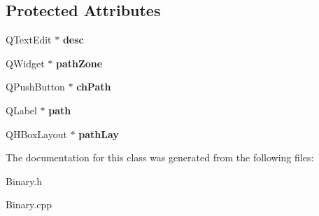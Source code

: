 \subsection*{\-Protected \-Attributes}
\begin{DoxyCompactItemize}
\item 
\hypertarget{classBinaryEditor_adb862f876130ef1677d7e62c9b72975e}{\-Q\-Text\-Edit $\ast$ {\bfseries desc}}\label{classBinaryEditor_adb862f876130ef1677d7e62c9b72975e}

\item 
\hypertarget{classBinaryEditor_a8212299c7c02322823bf1b15f91f9383}{\-Q\-Widget $\ast$ {\bfseries path\-Zone}}\label{classBinaryEditor_a8212299c7c02322823bf1b15f91f9383}

\item 
\hypertarget{classBinaryEditor_a86cbd1cb540429e107a6c93190f2801c}{\-Q\-Push\-Button $\ast$ {\bfseries ch\-Path}}\label{classBinaryEditor_a86cbd1cb540429e107a6c93190f2801c}

\item 
\hypertarget{classBinaryEditor_aa7fccc22edc7c9fa3d4af41aa58cc6aa}{\-Q\-Label $\ast$ {\bfseries path}}\label{classBinaryEditor_aa7fccc22edc7c9fa3d4af41aa58cc6aa}

\item 
\hypertarget{classBinaryEditor_a2c0119a9c6525e35ebf52cb8a8f3f9da}{\-Q\-H\-Box\-Layout $\ast$ {\bfseries path\-Lay}}\label{classBinaryEditor_a2c0119a9c6525e35ebf52cb8a8f3f9da}

\end{DoxyCompactItemize}


\-The documentation for this class was generated from the following files\-:\begin{DoxyCompactItemize}
\item 
\-Binary.\-h\item 
\-Binary.\-cpp\end{DoxyCompactItemize}
